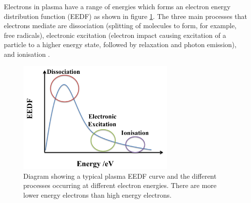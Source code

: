 \documentclass[11pt, oneside]{article}   	%
\begin{document}
Electrons in plasma have a range of energies which forms an electron energy distribution function (EEDF) as shown in figure \ref{fig:EEDF}.
The three main processes that electrons mediate are dissociation (splitting of molecules to form, for example, free radicals), electronic excitation (electron impact causing excitation of a particle to a higher energy state, followed by relaxation and photon emission), and ionisation \cite{PlasmaMedicineLaroussi}. 

\begin{figure}
	\centering
	\includegraphics[width=0.7\textwidth]{Figures/EEDF}
	\caption{Diagram showing a typical plasma EEDF curve and the different processes occurring at different electron energies. There are more lower energy electrons than high energy electrons.}
	\label{fig:EEDF}
\end{figure}


\end{document}
